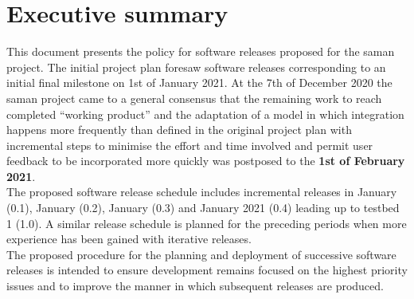 \section{Executive summary}

\noindent This document presents the policy for software releases proposed for the saman project. The initial project plan foresaw software releases corresponding to an initial final milestone on 1st of January 2021. At the 7th of December 2020 the saman project came to a general consensus that the remaining work to reach completed “working product” and the adaptation of a model in which integration happens more frequently than defined in the original project plan with incremental steps to minimise the effort and time involved and permit user feedback to be incorporated more quickly was postposed to the \textbf{1st of February 2021}.\\

\noindent The proposed software release schedule includes incremental releases in January (0.1), January (0.2), January (0.3) and January 2021 (0.4) leading up to testbed 1 (1.0). A similar release schedule is planned for the preceding periods when more experience has been gained with iterative releases.\\

\noindent The proposed procedure for the planning and deployment of successive software releases is intended to ensure development remains focused on the highest priority issues and to improve the manner in which subsequent releases are produced.\\

